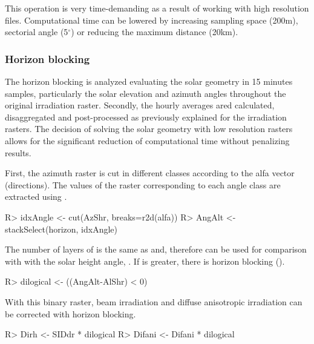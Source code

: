 \documentclass[article]{jss}
\begin{document}
This operation is very time-demanding as a result of working with high
resolution files. Computational time can be lowered by increasing
sampling space (200m), sectorial angle (5$^\circ$) or reducing the
maximum distance (20km).


\subsubsection{Horizon blocking}
\label{sec-1-5-2}

The horizon blocking is analyzed evaluating the solar geometry in 15
minutes samples, particularly the solar elevation and azimuth angles
throughout the original irradiation raster. Secondly, the hourly
averages ared calculated, disaggregated and post-processed as
previously explained for the irradiation rasters. The decision of
solving the solar geometry with low resolution rasters allows for the
significant reduction of computational time without penalizing
results.

First, the azimuth raster is cut in different classes according to the
alfa vector (directions). The values of the  raster
corresponding to each angle class are extracted using
.

\begin{CodeChunk}
\begin{CodeInput}
R> idxAngle <- cut(AzShr, breaks=r2d(alfa))
R> AngAlt <- stackSelect(horizon, idxAngle)
\end{CodeInput}
\end{CodeChunk}


The number of layers of  is the same as 
and, therefore can be used for comparison with with the solar height
angle, . If  is greater, there is horizon
blocking ().

\begin{CodeChunk}
\begin{CodeInput}
R> dilogical <- ((AngAlt-AlShr) < 0)
\end{CodeInput}
\end{CodeChunk}

With this binary raster, beam irradiation and diffuse anisotropic
irradiation can be corrected with horizon blocking.
\begin{CodeChunk}
\begin{CodeInput}
R> Dirh <- SIDdr * dilogical
R> Difani <- Difani * dilogical
\end{CodeInput}
\end{CodeChunk}
\end{document}
